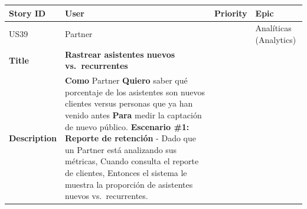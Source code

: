 {\def\LTcaptype{none} %
\begin{longtable}[]{@{}
  >{\raggedright\arraybackslash}p{}
  >{\raggedright\arraybackslash}p{}
  >{\raggedright\arraybackslash}p{}
  >{\raggedright\arraybackslash}p{}@{}}
\toprule\noalign{}
\begin{minipage}[b]{\linewidth}\raggedright
Story ID
\end{minipage} & \begin{minipage}[b]{\linewidth}\raggedright
User
\end{minipage} & \begin{minipage}[b]{\linewidth}\raggedright
Priority
\end{minipage} & \begin{minipage}[b]{\linewidth}\raggedright
Epic
\end{minipage} \\
\midrule\noalign{}
\endhead
\bottomrule\noalign{}
\endlastfoot
US39 & Partner & 8 & Analíticas (Analytics) \\
\textbf{Title} & \textbf{Rastrear asistentes nuevos vs.~recurrentes} &
& \\
\textbf{Description} & \textbf{Como} Partner \textbf{Quiero} saber qué
porcentaje de los asistentes son nuevos clientes versus personas que ya
han venido antes \textbf{Para} medir la captación de nuevo público.
\textbf{Escenario \#1: Reporte de retención} - Dado que un Partner está
analizando sus métricas, Cuando consulta el reporte de clientes,
Entonces el sistema le muestra la proporción de asistentes nuevos
vs.~recurrentes. & & \\
\end{longtable}
}

